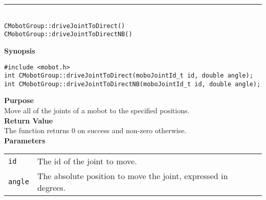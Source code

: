 \noindent
\vspace{5pt}
\rule{4.5in}{0.015in}\\
\noindent
{\LARGE \texttt{CMobotGroup::driveJointToDirect()}}\\
{\LARGE \texttt{CMobotGroup::driveJointToDirectNB()}}\\
{}

\noindent
{\bf Synopsis}
\vspace{-8pt}
\begin{verbatim}
#include <mobot.h>
int CMobotGroup::driveJointToDirect(moboJointId_t id, double angle);
int CMobotGroup::driveJointToDirectNB(moboJointId_t id, double angle);
\end{verbatim}

\noindent
{\bf Purpose}\\
Move all of the joints of a mobot to the specified positions.\\

\noindent
{\bf Return Value}\\
The function returns 0 on success and non-zero otherwise.\\

\noindent
{\bf Parameters}\\
\vspace{-0.1in}
\begin{description}
\item               
\begin{tabular}{p{15 mm}p{105 mm}}
\texttt{id} & The id of the joint to move. \\
\texttt{angle} & The absolute position to move the joint, expressed in degrees. \\
\end{tabular}
\end{description}
\noindent

